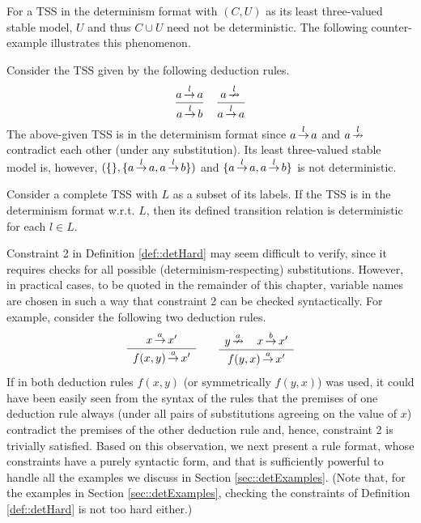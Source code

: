For a TSS in the determinism format with $(C, U)$ as its least three-valued stable model, $U$ and thus $C \cup U$ need not be deterministic.
The following counter-example illustrates this phenomenon.

\begin{example}
Consider the TSS given by the following deduction rules.
\[
\sosrule[]{a \trans{l} a}{a \trans{l} b} \quad \sosrule[]{a \ntrans{l}}{a \trans{l} a}
\]
The above-given TSS is in the determinism format since $a \,{\stackrel{{l}}{\rightarrow}}\, a$ and $a \,{\stackrel{{l}}{\nrightarrow}}\,$ contradict each other (under any substitution).
Its least three-valued stable model is, however, $(\{\}, \{a \,{\stackrel{{l}}{\rightarrow}}\, a, a \,{\stackrel{{l}}{\rightarrow}}\, b\})$ and $\{a \,{\stackrel{{l}}{\rightarrow}}\, a, a \,{\stackrel{{l}}{\rightarrow}}\, b\}$ is not deterministic.
\end{example}

\begin{corollary}
Consider a complete TSS with $L$ as a subset of its labels. If the TSS is in the determinism format w.r.t. $L$, then its defined transition relation is deterministic for each $l \in L$.
\end{corollary}

Constraint 2 in Definition \ref{def::detHard} may seem difficult to verify,
since it requires checks for all possible (determinism-respecting) substitutions.
However, in practical cases, to be quoted in the remainder of this chapter,
variable names are chosen in such a way that constraint 2
can be checked syntactically.
For example, consider the following two deduction rules.
\[
\sosrule{x \trans{a} x'}{f(x,y) \trans{a} x'} \qquad
\sosrule{y \ntrans{a} \quad x \trans{b} x'}{f(y,x) \trans{a} x'}
\]
If in both deduction rules $f(x,y)$ (or symmetrically $f(y,x)$) was used,
it could have been easily seen from the syntax of the rules that the premises of one deduction rule
always (under all pairs of substitutions agreeing on the value of $x$) contradict the premises of the other deduction rule and, hence, constraint 2 is trivially satisfied.
Based on this observation, we next present a rule format, whose constraints
have a purely syntactic form,
and that is sufficiently powerful to handle all the examples we discuss
in Section \ref{sec::detExamples}.
(Note that, for the examples in Section \ref{sec::detExamples}, checking the constraints of Definition \ref{def::detHard} is
not too hard either.)



